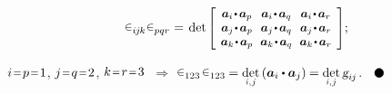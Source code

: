 \begin{otherlanguage}{russian}
\nopagebreak\vspace{-0.2em}
\begin{equation*}
\permutationsparitysymbols{i\hspace{-0.1ex}j\hspace{-0.1ex}k} \permutationsparitysymbols{pqr} = \hspace{0.25ex}
\determinant\hspace{-0.1ex}
\scalebox{0.92}[0.92]{$\left[\hspace{-0.16ex}\begin{array}{c@{\hspace{.64em}}c@{\hspace{.64em}}c}
\bm{a}_i \narrowdotp\hspace{.12ex} \bm{a}_p & \bm{a}_i \narrowdotp\hspace{.12ex} \bm{a}_q & \bm{a}_i \narrowdotp\hspace{.12ex} \bm{a}_r \\
\bm{a}_j \narrowdotp\hspace{.12ex} \bm{a}_p & \bm{a}_j \narrowdotp\hspace{.12ex} \bm{a}_q & \bm{a}_j \narrowdotp\hspace{.12ex} \bm{a}_r \\
\bm{a}_k \narrowdotp\hspace{.12ex} \bm{a}_p & \bm{a}_k \narrowdotp\hspace{.12ex} \bm{a}_q & \bm{a}_k \narrowdotp\hspace{.12ex} \bm{a}_r
\end{array}\hspace{-0.12ex}\right]$} ;
\end{equation*}

\vspace{-0.1em}\noindent
${i \narroweq p \narroweq 1}$, ${j \narroweq q \narroweq 2}$, ${k \narroweq r \narroweq 3}$ ${\,\Rightarrow}$ ${\permutationsparitysymbols{123} \hspace{.2ex} \permutationsparitysymbols{123} \hspace{-0.15ex} = \underset{\raisebox{.15em}{\scalebox{.7}{$i$,$\hspace{.15ex}j$}}}{\determinant} \left( \bm{a}_i \dotp \bm{a}_j \right) \hspace{-0.1ex} = \underset{\raisebox{.15em}{\scalebox{.7}{$i$,$\hspace{.15ex}j$}}}{\determinant} \, \textsl{g}_{i\hspace{-0.1ex}j}}$.
${ \hspace{.6em}
\tikz[baseline=-0.6ex] \draw [color=black, fill=black] (0, 0) circle (.8ex); }$


\end{otherlanguage}
